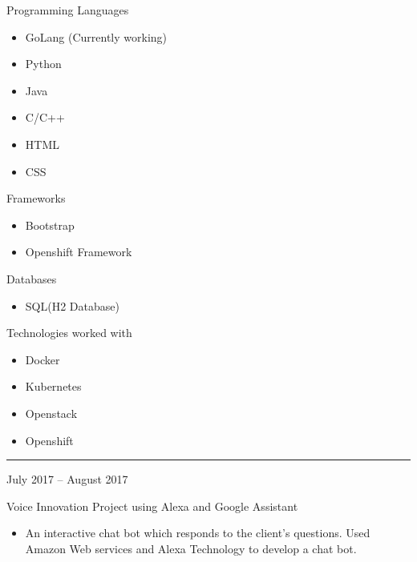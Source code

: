 \documentclass[a4paper,10pt]{article}
\newlength{\cvcolumngapwidth}
\newlength{\cvleftcolumnwidth}
\newlength{\cvrightcolumnwidth}
\newcommand{\cvsectionstyle}[1]{{\normalsize\cvsectionfont\textcolor{cvsectioncolor}{#1}}}
\newcommand{\cvtitlestyle}[1]{{\large\cvtitlefont\textcolor{cvtitlecolor}{#1}}}
\newcommand{\cvdurationstyle}[1]{{\small\cvdurationfont\textcolor{cvdurationcolor}{#1}}}
\newcommand{\cvheadingstyle}[1]{{\normalsize\cvheadingfont\textcolor{cvheadingcolor}{#1}}}
\newlength{\cvafteritemskipamount}
\newlength{\cvaftersectionskipamount}
\newlength{\cvbetweensectionandheadingextraskipamount}
\newlength{\cvaftertitleskipamount}
\newlength{\cvparskip}
\newcommand{\cvsection}[1]{
    \begin{minipage}[t]{\cvleftcolumnwidth}
        \raggedleft\cvsectionstyle{#1}
    \end{minipage}%
    \hspace{\cvcolumngapwidth}%
    \begin{minipage}[t]{\cvrightcolumnwidth}
        \textcolor{cvrulecolor}{\rule{\cvrightcolumnwidth}{0.3mm}}
    \end{minipage}

    \vspace{\cvaftersectionskipamount}
}
\newcommand{\cvitem}[2]{
    \begin{minipage}[t]{\cvleftcolumnwidth}
        \raggedleft #1
    \end{minipage}%
    \hspace{\cvcolumngapwidth}%
    \begin{minipage}[t]{\cvrightcolumnwidth}
        \setlength{\parskip}{\cvparskip} #2
    \end{minipage}

    \vspace{\cvafteritemskipamount}
}
\newcommand{\cvtitle}[1]{
    \cvtitlestyle{#1}

    \vspace{\cvaftertitleskipamount}
    \vspace{-\cvparskip}
}
\begin{document}
\cvitem{
    \cvheadingstyle{Programming Languages}
}{
    
    \begin{itemize}
    \item GoLang (Currently working)
    \item Python
        \item Java
         \item C/C++
          \item HTML
           \item CSS
            
            
    \end{itemize}

    
}
\cvitem{
    \cvheadingstyle{Frameworks}
}{
    
    \begin{itemize}
        \item Bootstrap
        \item Openshift Framework
    \end{itemize}

    
}

\cvitem{
    \cvheadingstyle{Databases}
}{
    
    \begin{itemize}
        \item SQL(H2 Database)
    \end{itemize}

    
}

\cvitem{
    \cvheadingstyle{Technologies worked with}
}{
    
    \begin{itemize}
        \item Docker
        \item Kubernetes
        \item Openstack
        \item Openshift
    \end{itemize}

    
}


\cvsection{Projects}

\vspace{\cvbetweensectionandheadingextraskipamount}

\cvitem{
    \cvdurationstyle{July 2017 -- August 2017}
}{
    \cvtitle{Voice Innovation Project using Alexa and Google Assistant}

    \begin{itemize}[leftmargin=*]
        \item An interactive chat bot which responds to the client's questions. Used Amazon Web services and Alexa Technology to develop a chat bot.
        
    \end{itemize}
}
\end{document}
